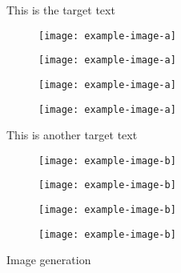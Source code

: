 \begin{figure}[ht]
\centering

\begin{minipage}[t]{0.2\textwidth}
    \vspace{2em}
    This is the target text
\end{minipage}%
\hspace{2mm}%
\begin{minipage}[t]{0.75\textwidth}
\begin{subfigure}[t]{0.25\textwidth}
    \caption*{\vit}
    \texttt{[image: example-image-a]}
\end{subfigure}%
\begin{subfigure}[t]{0.25\textwidth}
    \caption*{\vit \tecoa}
    \texttt{[image: example-image-a]}
\end{subfigure}%
\begin{subfigure}[t]{0.25\textwidth}
    \caption*{\convnext}
    \texttt{[image: example-image-a]}
\end{subfigure}%
\begin{subfigure}[t]{0.25\textwidth}
    \caption*{\convnext \tecoa}
    \texttt{[image: example-image-a]}
\end{subfigure}%
\end{minipage}

\begin{minipage}[t]{0.2\textwidth}
    \vspace{1em}
    This is another target text
\end{minipage}%
\hspace{2mm}%
\begin{minipage}[t]{0.75\textwidth}
\vspace{0pt}
\begin{subfigure}[t]{0.25\textwidth}
    \texttt{[image: example-image-b]}
\end{subfigure}%
\begin{subfigure}[t]{0.25\textwidth}
    \texttt{[image: example-image-b]}
\end{subfigure}%
\begin{subfigure}[t]{0.25\textwidth}
    \texttt{[image: example-image-b]}
\end{subfigure}%
\begin{subfigure}[t]{0.25\textwidth}
    \texttt{[image: example-image-b]}
\end{subfigure}%
\end{minipage}


\caption{Image generation}
\end{figure}